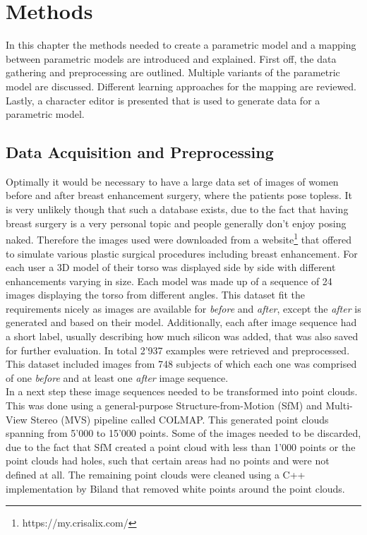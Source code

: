 \chapter{Methods}
In this chapter the methods needed to create a parametric model and  a mapping between parametric models are introduced and explained. First off, the data gathering and preprocessing are outlined. Multiple variants of the parametric model are discussed. Different learning approaches for the mapping are reviewed. Lastly, a character editor is presented that is used to generate data for a parametric model.

\section{Data Acquisition and Preprocessing}
Optimally it would be necessary to have a large data set of images of women before and after breast enhancement surgery, where the patients pose topless. It is very unlikely though that such a database exists, due to the fact that having breast surgery is a very personal topic and people generally don't enjoy posing naked. Therefore the images used were downloaded from a website\footnote{https://my.crisalix.com/} that offered to simulate various plastic surgical procedures including breast enhancement. For each user a 3D model of their torso was displayed side by side with different enhancements varying in size. Each model was made up of a sequence of 24 images displaying the torso from different angles. This dataset fit the requirements nicely as images are available for \textit{before} and \textit{after}, except the \textit{after} is generated and based on their model. Additionally, each after image sequence had a short label, usually describing how much silicon was added, that was also saved for further evaluation. In total 2'937 examples were retrieved and preprocessed. This dataset included images from 748 subjects of which each one was comprised of one \textit{before} and at least one \textit{after} image sequence.\\

In a next step these image sequences needed to be transformed into point clouds. This was done using a general-purpose Structure-from-Motion (SfM) \cite{schoenberger2016sfm} and Multi-View Stereo (MVS) \cite{schoenberger2016mvs} pipeline called COLMAP. This generated point clouds spanning from 5'000 to 15'000 points. Some of the images needed to be discarded, due to the fact that SfM created a point cloud with less than 1'000 points or the point clouds had holes, such that certain areas had no points and were not defined at all. The remaining point clouds were cleaned using a C++ implementation by Biland \cite{Biland17} that removed white points around the point clouds.

